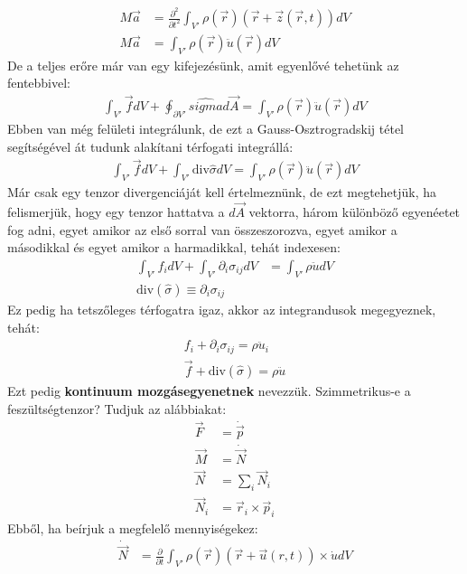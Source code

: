 \documentclass{article}
\begin{document}
\begin{align*}
M\vec{a} &= \frac{\partial^2}{\partial t^2} \int_{V'} \rho(\vec{r}) (\vec{r}+\vec{z}(\vec{r}, t)) dV \\
M \vec{a} &= \int_{V'} \rho(\vec{r}) \ddot{u}(\vec{r}) dV 
\end{align*}
De a teljes erőre már van egy kifejezésünk, amit egyenlővé tehetünk az fentebbivel:
\begin{align*}
\int_{V'} \vec{f} dV + \oint_{\partial V'} \hat{sigma} d\vec{A} = \int_{V'} \rho(\vec{r}) \ddot{u}(\vec{r}) dV 
\end{align*}
Ebben van még felületi integrálunk, de ezt a Gauss-Osztrogradskij tétel segítségével át tudunk alakítani térfogati integrállá:
\begin{align*}
\int_{V'} \vec{f} dV + \int_{V'} \mathrm{div} \hat{\sigma} dV = \int_{V'} \rho(\vec{r}) \ddot{u}(\vec{r}) dV 
\end{align*}
Már csak egy tenzor divergenciáját kell értelmeznünk, de ezt megtehetjük, ha felismerjük, hogy egy tenzor hattatva a $d\vec{A}$ vektorra, három különböző egyenéetet fog adni, egyet amikor az első sorral van összeszorozva, egyet amikor  a másodikkal és egyet amikor a harmadikkal, tehát indexesen:
\begin{align*}
\int_{V'} f_i dV + \int_{V'} \partial_i \sigma_{ij} dV &= \int_{V'} \rho \ddot{u} dV \\
\mathrm{div}(\hat{\sigma}) \equiv \partial_i \sigma_{ij}
\end{align*}
Ez pedig ha tetszőleges térfogatra igaz, akkor az integrandusok megegyeznek, tehát:
\begin{align*}
f_i + \partial_i \sigma_{ij} = \rho \ddot{u}_i \\
\vec{f} + \mathrm{div} (\hat{\sigma}) = \rho \ddot{u}
\end{align*}
Ezt pedig \textbf{kontinuum mozgásegyenetnek} nevezzük. Szimmetrikus-e a feszültségtenzor? Tudjuk az alábbiakat:
\begin{align*}
\vec{F} &= \dot{\vec{p}} \\
\vec{M} &= \dot{\vec{N}} \\
\vec{N} &= \sum_i \vec{N}_i \\
\vec{N}_i &= \vec{r}_i \times \vec{p}_i
\end{align*}
Ebből, ha beírjuk a megfelelő mennyiségekez:
\begin{align*}
\dot{\vec{N}} &= \frac{ \partial}{\partial t} \int_{V'} \rho(\vec{r}) (\vec{r} + \vec{u}(r,t)) \times \dot{u} dV 
\end{align*}
\end{document}
